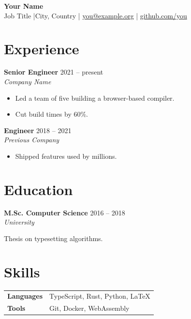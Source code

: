 \documentclass[10pt,a4paper]{article}
\newcommand{\entry}[4]{%
  \textbf{#1} \hfill {\small\color{gray} #2}\\
  \textit{#3}\par\smallskip #4\par\medskip}
\begin{document}
{\Huge\bfseries Your Name}\\[4pt]
{\color{gray} Job Title \quad|\quad City, Country \quad|\quad
 \href{mailto:you@example.org}{you@example.org} \quad|\quad
 \href{https://github.com/}{github.com/you}}

\section{Experience}
\entry{Senior Engineer}{2021 -- present}{Company Name}{%
\begin{itemize}
  \item Led a team of five building a browser-based compiler.
  \item Cut build times by 60\%.
\end{itemize}}

\entry{Engineer}{2018 -- 2021}{Previous Company}{%
\begin{itemize}
  \item Shipped features used by millions.
\end{itemize}}

\section{Education}
\entry{M.Sc. Computer Science}{2016 -- 2018}{University}{Thesis on typesetting algorithms.}

\section{Skills}
\begin{tabularx}{\linewidth}{@{}lX@{}}
  \textbf{Languages} & TypeScript, Rust, Python, \LaTeX \\
  \textbf{Tools}     & Git, Docker, WebAssembly \\
\end{tabularx}
\end{document}
